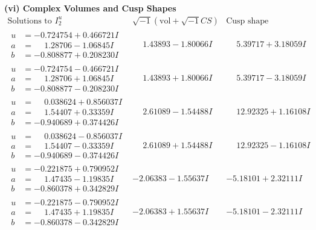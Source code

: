 \documentclass[1p]{elsarticle_modified}
\theoremstyle{definition}
\newcommand{\I}{\sqrt{-1}}
\begin{document}
\newpage\flushleft \textbf{(vi) Complex Volumes and Cusp Shapes}
$$\begin{array}{c|c|c}  
\text{Solutions to }I^u_{2}& \I (\text{vol} + \sqrt{-1}CS) & \text{Cusp shape}\\
 \hline 
\begin{aligned}
u &= -0.724754 + 0.466721 I \\
a &= \phantom{-}1.28706 - 1.06845 I \\
b &= -0.808877 + 0.208230 I\end{aligned}
 & \phantom{-}1.43893 - 1.80066 I & \phantom{-}5.39717 + 3.18059 I \\ \hline\begin{aligned}
u &= -0.724754 - 0.466721 I \\
a &= \phantom{-}1.28706 + 1.06845 I \\
b &= -0.808877 - 0.208230 I\end{aligned}
 & \phantom{-}1.43893 + 1.80066 I & \phantom{-}5.39717 - 3.18059 I \\ \hline\begin{aligned}
u &= \phantom{-}0.038624 + 0.856037 I \\
a &= \phantom{-}1.54407 + 0.33359 I \\
b &= -0.940689 + 0.374426 I\end{aligned}
 & \phantom{-}2.61089 - 1.54488 I & \phantom{-}12.92325 + 1.16108 I \\ \hline\begin{aligned}
u &= \phantom{-}0.038624 - 0.856037 I \\
a &= \phantom{-}1.54407 - 0.33359 I \\
b &= -0.940689 - 0.374426 I\end{aligned}
 & \phantom{-}2.61089 + 1.54488 I & \phantom{-}12.92325 - 1.16108 I \\ \hline\begin{aligned}
u &= -0.221875 + 0.790952 I \\
a &= \phantom{-}1.47435 - 1.19835 I \\
b &= -0.860378 + 0.342829 I\end{aligned}
 & -2.06383 - 1.55637 I & -5.18101 + 2.32111 I \\ \hline\begin{aligned}
u &= -0.221875 - 0.790952 I \\
a &= \phantom{-}1.47435 + 1.19835 I \\
b &= -0.860378 - 0.342829 I\end{aligned}
 & -2.06383 + 1.55637 I & -5.18101 - 2.32111 I \\ \hline\begin{aligned}

\end{aligned}
\end{array}$$
\end{document}
